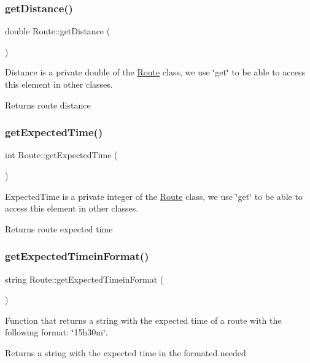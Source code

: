 \subsubsection{\texorpdfstring{get\+Distance()}{getDistance()}}
{\footnotesize\ttfamily double Route\+::get\+Distance (\begin{DoxyParamCaption}{ }\end{DoxyParamCaption})}

Distance is a private double of the \hyperlink{classRoute}{Route} class, we use \char`\"{}get\char`\"{} to be able to access this element in other classes. \begin{DoxyReturn}{Returns}
route distance 
\end{DoxyReturn}
\hypertarget{classRoute_a5e9243c4341dee71d9f1c5a310b6538f}{}\label{classRoute_a5e9243c4341dee71d9f1c5a310b6538f} 
\subsubsection{\texorpdfstring{get\+Expected\+Time()}{getExpectedTime()}}
{\footnotesize\ttfamily int Route\+::get\+Expected\+Time (\begin{DoxyParamCaption}{ }\end{DoxyParamCaption})}

Expected\+Time is a private integer of the \hyperlink{classRoute}{Route} class, we use \char`\"{}get\char`\"{} to be able to access this element in other classes. \begin{DoxyReturn}{Returns}
route expected time 
\end{DoxyReturn}
\hypertarget{classRoute_a7db106e71797ccd6eb91cf36fbe9987d}{}\label{classRoute_a7db106e71797ccd6eb91cf36fbe9987d} 
\subsubsection{\texorpdfstring{get\+Expected\+Timein\+Format()}{getExpectedTimeinFormat()}}
{\footnotesize\ttfamily string Route\+::get\+Expected\+Timein\+Format (\begin{DoxyParamCaption}{ }\end{DoxyParamCaption})}

Function that returns a string with the expected time of a route with the following format\+: \char`\"{}15h30m\char`\"{}. \begin{DoxyReturn}{Returns}
a string with the expected time in the formated needed 
\end{DoxyReturn}
\hypertarget{classRoute_a3b912b298bc6c3c1656a2d31e6541315}{}\label{classRoute_a3b912b298bc6c3c1656a2d31e6541315} 
